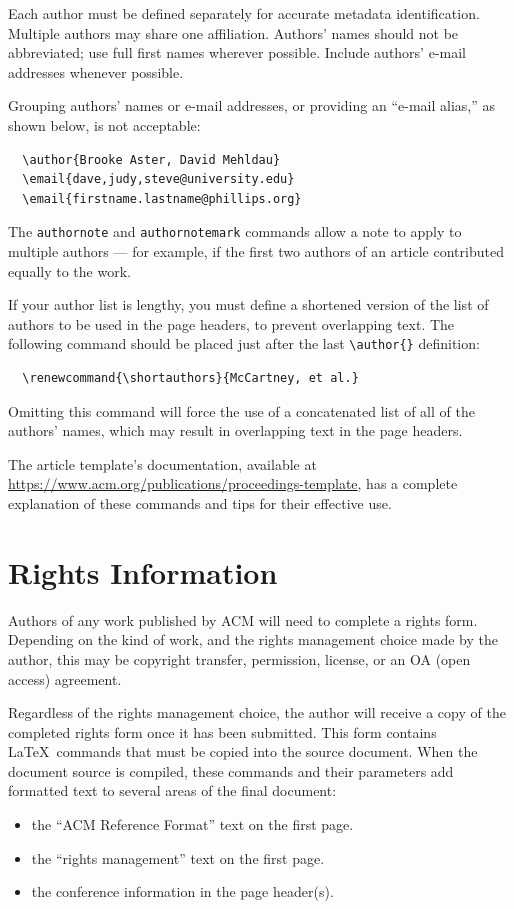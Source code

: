 \documentclass[acmsmall]{acmart}
\begin{document}
Each author must be defined separately for accurate metadata
identification. Multiple authors may share one affiliation. Authors'
names should not be abbreviated; use full first names wherever
possible. Include authors' e-mail addresses whenever possible.

Grouping authors' names or e-mail addresses, or providing an ``e-mail
alias,'' as shown below, is not acceptable:
\begin{verbatim}
  \author{Brooke Aster, David Mehldau}
  \email{dave,judy,steve@university.edu}
  \email{firstname.lastname@phillips.org}
\end{verbatim}

The \verb|authornote| and \verb|authornotemark| commands allow a note
to apply to multiple authors --- for example, if the first two authors
of an article contributed equally to the work.

If your author list is lengthy, you must define a shortened version of
the list of authors to be used in the page headers, to prevent
overlapping text. The following command should be placed just after
the last \verb|\author{}| definition:
\begin{verbatim}
  \renewcommand{\shortauthors}{McCartney, et al.}
\end{verbatim}
Omitting this command will force the use of a concatenated list of all
of the authors' names, which may result in overlapping text in the
page headers.

The article template's documentation, available at
\url{https://www.acm.org/publications/proceedings-template}, has a
complete explanation of these commands and tips for their effective
use.

\section{Rights Information}

Authors of any work published by ACM will need to complete a rights
form. Depending on the kind of work, and the rights management choice
made by the author, this may be copyright transfer, permission,
license, or an OA (open access) agreement.

Regardless of the rights management choice, the author will receive a
copy of the completed rights form once it has been submitted. This
form contains \LaTeX\ commands that must be copied into the source
document. When the document source is compiled, these commands and
their parameters add formatted text to several areas of the final
document:
\begin{itemize}
\item the ``ACM Reference Format'' text on the first page.
\item the ``rights management'' text on the first page.
\item the conference information in the page header(s).
\end{itemize}
\end{document}
